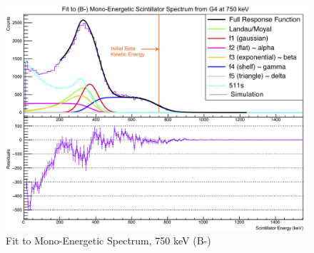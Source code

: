 \begin{figure}[h!!tb]
	\centering
	\includegraphics[width=.999\linewidth]
	{Figures/MonoFit_750.png}
	\caption[Fit to Mono-Energetic Spectrum, 750 keV]{Fit to Mono-Energetic Spectrum, 750 keV (B-)}	
	\label{fig:lineshape_750}
\end{figure}



